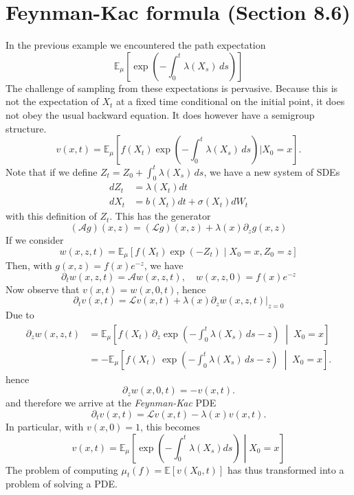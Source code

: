 \documentclass[11pt]{article}
\begin{document}
\section*{Feynman-Kac formula (Section 8.6)}
In the previous example we encountered the path expectation 
\begin{equation}
{\mathbb E}_{\mu}\!\left[
\exp\!\left(-\int_0^t \lambda(X_s)\,ds\right)
\right]
\end{equation}
The challenge of sampling from these expectations is pervasive. Because this is not the expectation of $X_t$ at a fixed time conditional on the initial point, it does not obey the usual backward equation. It does however have a semigroup structure.
\begin{equation}
v(x,t)  = {\mathbb E}_{\mu}\!\left[f(X_t)
\exp\!\left(-\int_0^t \lambda(X_s)\,ds\right)|X_0=x
\right]. 
\end{equation}
Note that if we define $Z_t = Z_0+\int_0^t\lambda(X_s)\,ds$, we have a new system of SDEs
\begin{align}
dZ_t &= \lambda(X_t)dt\\
dX_t &= b(X_t)dt + \sigma(X_t)dW_t
\end{align}
with this definition of $Z_t$. 
This has the generator 
\begin{equation}
({\mathcal A}g)(x,z) = ({\mathcal L}g)(x,z) + \lambda(x)\partial_z g(x,z)
\end{equation}
If we consider 
\begin{equation}
w(x,z,t) = {\mathbb E}_{\mu}\!\left[f(X_t)
\exp\!\left(-Z_t\right)\mid X_0=x,Z_0=z
\right]
\end{equation}
Then, with $g(x,z) = f(x)e^{-z}$, we have
\begin{equation}
\partial_t w(x,z,t) = {\mathcal A}w(x,z,t),\quad w(x,z,0) = f(x)e^{-z}
\end{equation}
Now observe that $v(x,t) = w(x,0,t)$, hence 
\begin{equation}
\partial_t v(x,t) = {\mathcal L}v(x,t) +\lambda(x) \partial_z w(x,z,t)\Big|_{z=0}
\end{equation}
Due to 
\begin{align}
\partial_z w(x,z,t)
&=
\mathbb E_{\mu}\!\left[
f(X_t)\,\partial_z \exp\!\left(-\int_0^t\lambda(X_s)\,ds-z\right)
\;\middle|\; X_0=x
\right]\\
&=
-\mathbb E_{\mu}\!\left[
f(X_t)\,\exp\!\left(-\int_0^t\lambda(X_s)\,ds-z\right)
\;\middle|\; X_0=x
\right].
\end{align}
hence 
\begin{equation}
\partial_z w(x,0,t) = -v(x,t).
\end{equation}
and therefore we arrive at the \emph{Feynman-Kac} PDE
\begin{equation}\label{eq:fk}
\partial_t v(x,t) = {\mathcal L}v(x,t) -\lambda(x) v(x,t).
\end{equation}
In particular, with $v(x,0) =1$, this becomes 
\begin{equation}
v(x,t) = {\mathbb E}_{\mu} \left[\exp\left(- \int_0^t\lambda(X_s)ds \right)\middle| X_0 = x \right]
\end{equation}
The problem of computing $\mu_t(f) = {\mathbb E}[v(X_0,t)]$ has thus transformed into a problem of solving a PDE. 
\end{document}
